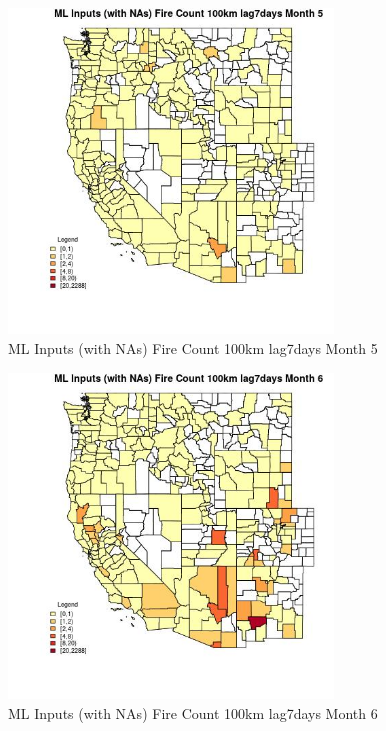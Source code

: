 \begin{figure} 
\centering  
\includegraphics[width=0.77\textwidth]{Code_Outputs/Report_ML_input_PM25_Step4_part_e_de_duplicated_aves_compiled_2019-05-20wNAs_CountyFire_Count_100km_lag7daysmedianMonth5.jpg} 
\caption{\label{fig:Report_ML_input_PM25_Step4_part_e_de_duplicated_aves_compiled_2019-05-20wNAsCountyFire_Count_100km_lag7daysmedianMonth5}ML Inputs (with NAs) Fire Count 100km lag7days Month 5} 
\end{figure} 
 

\begin{figure} 
\centering  
\includegraphics[width=0.77\textwidth]{Code_Outputs/Report_ML_input_PM25_Step4_part_e_de_duplicated_aves_compiled_2019-05-20wNAs_CountyFire_Count_100km_lag7daysmedianMonth6.jpg} 
\caption{\label{fig:Report_ML_input_PM25_Step4_part_e_de_duplicated_aves_compiled_2019-05-20wNAsCountyFire_Count_100km_lag7daysmedianMonth6}ML Inputs (with NAs) Fire Count 100km lag7days Month 6} 
\end{figure} 
 

